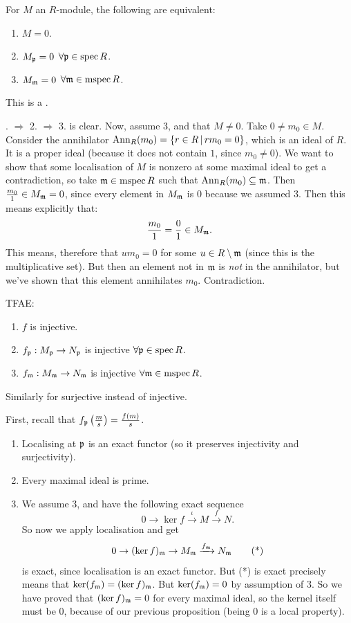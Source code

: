 \documentclass{article}
\begin{document}
\begin{fancyprop}{}
    For $M$ an $R$-module, the following are equivalent: \begin{enumerate}
        \item $M=0$.
        \item $M_{\mathfrak{p}} = 0$ $\forall \mathfrak{p} \in \operatorname{spec} R$.
        \item $M_{\mathfrak{m}}=0$ $\forall \mathfrak{m} \in \operatorname{mspec} R$.
    \end{enumerate}
    This is a .
\end{fancyprop}
. $\Rightarrow$ 2. $\Rightarrow$ 3. is clear. \gap Now, assume 3, and that $M\neq 0$. Take $0 \neq m_0 \in M$. Consider the annihilator $\operatorname{Ann}_{R}(m_0) = \{ r \in R \, | \, rm_0 = 0\}$, which is an ideal of $R$. It is a proper ideal (because it does not contain $1$, since $m_0 \neq 0$). \gap 
We want to show that some localisation of $M$ is nonzero at some maximal ideal to get a contradiction, so take $\mathfrak{m} \in \operatorname{mspec} R$ such that $\operatorname{Ann}_{R}(m_0) \subseteq \mathfrak{m}$. Then $\frac{m_0}{1} \in M_{\mathfrak{m}} = 0$, since every element in $M_{\mathfrak{m}}$ is $0$ because we assumed 3. Then this means explicitly that: \[ \frac{m_{0}}{1} = \frac{0}{1} \in M_{\mathfrak{m}}.\]
This means, therefore that $um_{0} = 0$ for some $u \in R \setminus \mathfrak{m}$ (since this is the multiplicative set). But then an element not in $\mathfrak{m}$ is \textit{not} in the annihilator, but we've shown that this element annihilates $m_{0}$. Contradiction. \endproof
\begin{fancyprop}
    TFAE: \begin{enumerate}
        \item $f$ is injective.
        \item $f_{\mathfrak{p}} : M_{\mathfrak{p}} \to N_{\mathfrak{p}}$ is injective $\forall \mathfrak{p} \in \operatorname{spec} R$.
        \item $f_{\mathfrak{m}} : M_{\mathfrak{m}} \to N_{\mathfrak{m}}$ is injective $\forall \mathfrak{m} \in \operatorname{mspec} R$.
    \end{enumerate}
    Similarly for surjective instead of injective.
\end{fancyprop}
\proof First, recall that $f_{\mathfrak{p}}\left( \frac{m}{s} \right) = \frac{f(m)}{s}$. \begin{enumerate}
    \item[$(1) \Rightarrow (2)$] Localising at $\mathfrak{p}$ is an exact functor (so it preserves injectivity and surjectivity).
    \item[$(2) \Rightarrow (3)$] Every maximal ideal is prime.
    \item[$(3) \Rightarrow (1)$] We assume 3, and have the following exact sequence \[ 0 \rightarrow \ker f \xrightarrow{\iota} M \xrightarrow{f} N.\] 
    So now we apply localisation and get \[ 0 \rightarrow (\ker f)_{\mathfrak{m}} \rightarrow M_{\mathfrak{m}} \xrightarrow{f_{\mathfrak{m}}} N_{\mathfrak{m}} \tag{*}\] is exact, since localisation is an exact functor. But (*) is exact precisely means that $\ker(f_{\mathfrak{m}})=(\ker f)_{\mathfrak{m}}$. 
    But $\ker(f_{\mathfrak{m}})=0$ by assumption of 3. So we have proved that $(\ker f)_{\mathfrak{m}}=0$ for every maximal ideal, so the kernel itself must be $0$, because of our previous proposition (being $0$ is a local property).
\end{enumerate}
\end{document}
